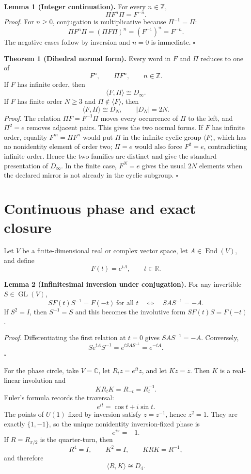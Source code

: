 \documentclass[11pt]{article}
\newcommand{\R}{\mathbb R}
\newcommand{\C}{\mathbb C}
\newcommand{\Z}{\mathbb Z}
\newcommand{\GL}{\operatorname{GL}}
\begin{document}
\textbf{Lemma 1 (Integer continuation).}
For every $n\in\Z$,
\[
\Pi F^n\Pi=F^{-n}.
\]
\textit{Proof.}
For $n\ge 0$, conjugation is multiplicative because $\Pi^{-1}=\Pi$:
\[
\Pi F^n\Pi=(\Pi F\Pi)^n=(F^{-1})^n=F^{-n}.
\]
The negative cases follow by inversion and $n=0$ is immediate. \hfill$\square$

\textbf{Theorem 1 (Dihedral normal form).}
Every word in $F$ and $\Pi$ reduces to one of
\[
F^n,\qquad \Pi F^n,
\qquad n\in\Z.
\]
If $F$ has infinite order, then
\[
\langle F,\Pi\rangle\cong D_{\infty}.
\]
If $F$ has finite order $N\ge 3$ and $\Pi\notin\langle F\rangle$, then
\[
\langle F,\Pi\rangle\cong D_N,
\qquad |D_N|=2N.
\]
\textit{Proof.}
The relation $\Pi F=F^{-1}\Pi$ moves every occurrence of $\Pi$ to the left, and $\Pi^2=e$ removes adjacent pairs. This gives the two normal forms. If $F$ has infinite order, equality $F^m=\Pi F^n$ would put $\Pi$ in the infinite cyclic group $\langle F\rangle$, which has no nonidentity element of order two; $\Pi=e$ would also force $F^2=e$, contradicting infinite order. Hence the two families are distinct and give the standard presentation of $D_\infty$. In the finite case, $F^N=e$ gives the usual $2N$ elements when the declared mirror is not already in the cyclic subgroup. \hfill$\square$

\section{Continuous phase and exact closure}
Let $V$ be a finite-dimensional real or complex vector space, let $A\in\operatorname{End}(V)$, and define
\[
F(t)=e^{tA},\qquad t\in\R.
\]

\textbf{Lemma 2 (Infinitesimal inversion under conjugation).}
For any invertible $S\in\GL(V)$,
\[
S F(t)S^{-1}=F(-t)\ \text{for all }t
\quad\Longleftrightarrow\quad
SAS^{-1}=-A.
\]
If $S^2=I$, then $S^{-1}=S$ and this becomes the involutive form $SF(t)S=F(-t)$.

\textit{Proof.}
Differentiating the first relation at $t=0$ gives $SAS^{-1}=-A$. Conversely,
\[
S e^{tA}S^{-1}=e^{tSAS^{-1}}=e^{-tA}.
\]
\hfill$\square$

For the phase circle, take $V=\C$, let $R_t z=e^{it}z$, and let $Kz=\overline z$. Then $K$ is a real-linear involution and
\[
KR_tK=R_{-t}=R_t^{-1}.
\]
Euler's formula records the traversal:
\[
e^{it}=\cos t+i\sin t.
\]
The points of $U(1)$ fixed by inversion satisfy $z=z^{-1}$, hence $z^2=1$. They are exactly $\{1,-1\}$, so the unique nonidentity inversion-fixed phase is
\[
e^{i\pi}=-1.
\]
If $R=R_{\pi/2}$ is the quarter-turn, then
\[
R^4=I,\qquad K^2=I,\qquad KRK=R^{-1},
\]
and therefore
\[
\langle R,K\rangle\cong D_4.
\]
\end{document}

